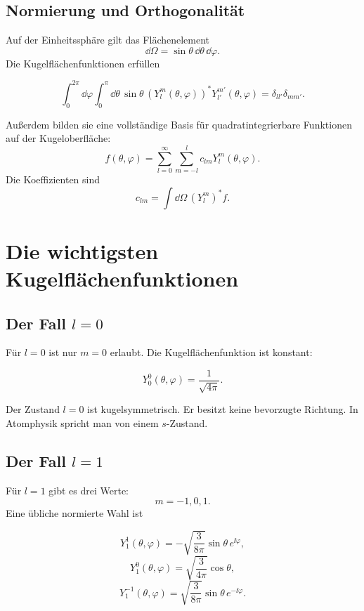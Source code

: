 \subsection{Normierung und Orthogonalität}

Auf der Einheitssphäre gilt das Flächenelement
\[
    \dd\Omega=\sin\theta\,\dd\theta\,\dd\varphi.
\]
Die Kugelflächenfunktionen erfüllen
\begin{formulabox}
\[
    \int_0^{2\pi}\dd\varphi\int_0^\pi\dd\theta\,\sin\theta\,
    \left(Y_l^m(\theta,\varphi)\right)^*Y_{l'}^{m'}(\theta,\varphi)
    =\delta_{ll'}\delta_{mm'}.
\]
\end{formulabox}

Außerdem bilden sie eine vollständige Basis für quadratintegrierbare Funktionen auf der Kugeloberfläche:
\[
    f(\theta,\varphi)=\sum_{l=0}^{\infty}\sum_{m=-l}^{l}c_{lm}Y_l^m(\theta,\varphi).
\]
Die Koeffizienten sind
\[
    c_{lm}=\int \dd\Omega\,\left(Y_l^m\right)^*f.
\]

\section{Die wichtigsten Kugelflächenfunktionen}

\subsection{Der Fall \(l=0\)}

Für \(l=0\) ist nur \(m=0\) erlaubt. Die Kugelflächenfunktion ist konstant:
\begin{formulabox}
\[
    Y_0^0(\theta,\varphi)=\frac{1}{\sqrt{4\pi}}.
\]
\end{formulabox}

\begin{conceptbox}
Der Zustand \(l=0\) ist kugelsymmetrisch. Er besitzt keine bevorzugte Richtung. In Atomphysik spricht man von einem \(s\)-Zustand.
\end{conceptbox}

\subsection{Der Fall \(l=1\)}

Für \(l=1\) gibt es drei Werte:
\[
    m=-1,0,1.
\]
Eine übliche normierte Wahl ist
\begin{formulabox}
\[
    Y_1^1(\theta,\varphi)
    =-\sqrt{\frac{3}{8\pi}}\sin\theta\,e^{\ii\varphi},
\]
\[
    Y_1^0(\theta,\varphi)
    =\sqrt{\frac{3}{4\pi}}\cos\theta,
\]
\[
    Y_1^{-1}(\theta,\varphi)
    =\sqrt{\frac{3}{8\pi}}\sin\theta\,e^{-\ii\varphi}.
\]
\end{formulabox}

